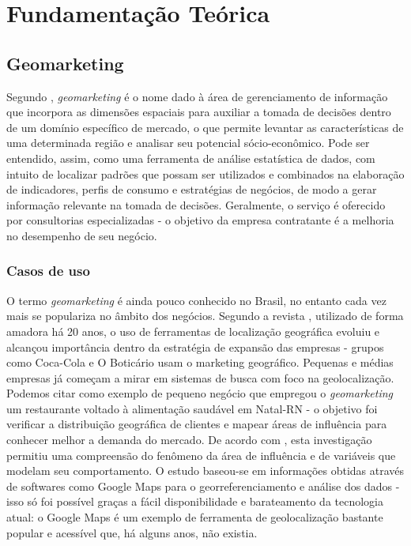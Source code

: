 
\chapter{Fundamentação Teórica}
\label{fundamentacao-teorica}

\section{Geomarketing}
\label{Geom}
Segundo , \emph{geomarketing} é o nome dado à área de
gerenciamento de informação que incorpora as dimensões espaciais para auxiliar a
tomada de decisões dentro de um domínio específico de mercado, o que permite
levantar as características de uma determinada região e analisar seu potencial
sócio-econômico. Pode ser entendido, assim, como uma ferramenta de análise
estatística de dados, com intuito de localizar padrões que possam ser utilizados
e combinados na elaboração de indicadores, perfis de consumo e estratégias de
negócios, de modo a gerar informação relevante na tomada de decisões.
Geralmente, o serviço é oferecido por consultorias especializadas - o  objetivo
da empresa  contratante é a melhoria no desempenho de seu negócio.

\subsection{Casos de uso}
O termo \emph{geomarketing} é ainda pouco conhecido no Brasil, no entanto cada
vez mais se populariza no âmbito dos negócios. Segundo a revista
, utilizado de forma amadora há 20 anos, o uso de ferramentas
de localização geográfica evoluiu e alcançou importância dentro da estratégia de
expansão das empresas - grupos como Coca-Cola e O Boticário usam o marketing
geográfico. Pequenas e médias empresas já começam a mirar em sistemas de busca
com foco na geolocalização. Podemos citar como exemplo de pequeno negócio que
empregou o \emph{geomarketing} um restaurante voltado à alimentação saudável em
Natal-RN - o objetivo foi verificar a distribuição geográfica de clientes e
mapear áreas de influência para conhecer melhor a demanda do mercado. De acordo
com , esta investigação permitiu uma compreensão do
fenômeno da área de influência e de variáveis que modelam seu comportamento. O
estudo baseou-se em informações obtidas através de softwares como Google
Maps para o georreferenciamento e análise dos dados - isso só foi possível
graças a fácil disponibilidade e barateamento da tecnologia atual: o
Google Maps é um exemplo de ferramenta de geolocalização bastante popular
e acessível que, há alguns anos, não existia.

